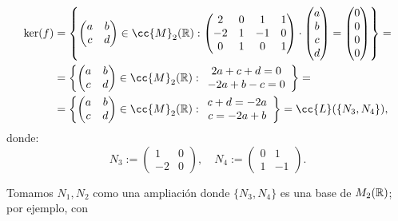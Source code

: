 \documentclass[12pt]{article}
\begin{document}
\begin{ejercicio}[2.5 puntos]
\begin{enumerate}
			\begin{align*}
			 \ker(f) &= 
			\left\{
			\begin{pmatrix}
				 a & b \\ 
				 c & d
			\end{pmatrix} \in \cc{M}_2(\R) : 
			\begin{pmatrix}
				2 & 0 & 1 & 1 \\
				-2 & 1 & -1 & 0 \\
				0 & 1 & 0 & 1
			\end{pmatrix} \cdot
			\begin{pmatrix}
				a \\
				b \\
				c \\
				d
			\end{pmatrix} = 
			\begin{pmatrix}
				0 \\
				0 \\
				0 \\
				0
			\end{pmatrix}
			\right\}=\\&=
			\left\{
			\begin{pmatrix}
				a & b \\
				c & d
			\end{pmatrix} \in \cc{M}_2(\R) : 
			\begin{array}{c}
				2a +c +d =0 \\
				-2a +b -c =0
			\end{array}
			\right\}
			=\\&=
			\left\{
			\begin{pmatrix}
				a & b \\
				c & d
			\end{pmatrix} \in \cc{M}_2(\R) : 
			\begin{array}{c}
				c +d = -2a \\
				c = -2a +b
			\end{array}
			\right\} = \cc{L}(\{N_3, N_4\}),
			\end{align*}
			donde:
			$$ N_3 := \begin{pmatrix}
				1 & 0 \\
				-2 & 0
			\end{pmatrix}, \quad
			N_4 := \begin{pmatrix}
				0 & 1 \\
				1 & -1
			\end{pmatrix}. $$
			
			Tomamos $N_1, N_2$ como una ampliación donde $\{N_3, N_4\}$ es una base de $M_2({\mathbb{R}})$; por ejemplo, con
			

\end{enumerate}
\end{ejercicio}
\end{document}
